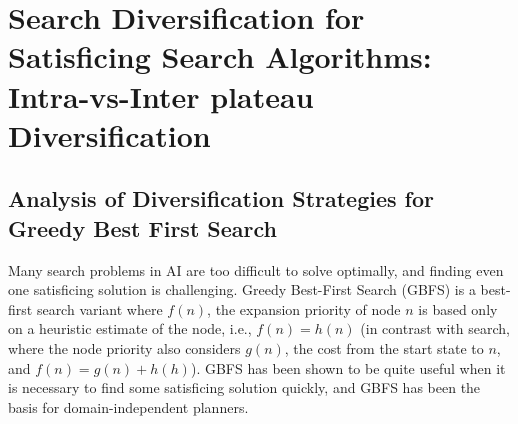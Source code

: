 
\chapter{Search Diversification for Satisficing Search Algorithms: Intra-vs-Inter plateau Diversification}




\section{Analysis of Diversification Strategies for Greedy Best First Search}

Many search problems in AI are too difficult to solve optimally, and finding even one satisficing solution is challenging. 
Greedy Best-First Search (GBFS) is a best-first search variant where $f(n)$, the expansion priority of node $n$ is based only on a heuristic estimate of the node, i.e., $f(n) = h(n)$  (in contrast with \astar search, where the node priority also considers $g(n)$, the cost from the start state to $n$, and $f(n) = g(n)+h(h)$).
GBFS has been shown to be quite useful when it is necessary to find some  satisficing solution quickly, and GBFS 
has been the basis for \lsota domain-independent planners. %

